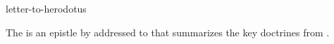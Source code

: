 \documentclass{stex}
\begin{document}
\begin{smodule}{letter-to-herodotus}
\begin{sparagraph}[style=symdoc]
The  is an epistle by  addressed to
 that summarizes the key doctrines from .
\end{sparagraph}
\end{smodule}
\end{document}
